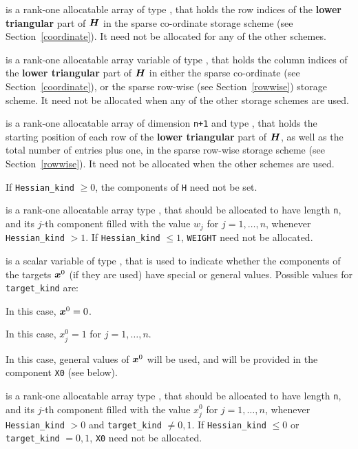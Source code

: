 \documentclass{galahad}
\begin{document}
\begin{description}
\begin{description}
 is a rank-one allocatable array of type \integer,
that holds the row indices of the {\bf lower triangular} part of ${\bm{H}}$
in the sparse co-ordinate storage scheme (see Section~\ref{coordinate}).
It need not be allocated for any of the other schemes.

 is a rank-one allocatable array variable of type \integer,
that holds the column indices of the {\bf lower triangular} part of
${\bm{H}}$ in either the sparse co-ordinate
(see Section~\ref{coordinate}), or the sparse row-wise
(see Section~\ref{rowwise}) storage scheme.
It need not be allocated when any of the other storage schemes are used.

 is a rank-one allocatable array of dimension {\tt n+1} and type
\integer, that holds the starting position of
each row of the {\bf lower triangular} part of ${\bm{H}}$, as well
as the total number of entries plus one, in the sparse row-wise storage
scheme (see Section~\ref{rowwise}). It need not be allocated when the
other schemes are used.
\end{description}
If {\tt Hessian\_kind} $\geq 0$, the components of {\tt H} need not be set.

 is a rank-one allocatable array type \realdp, that
should be allocated to have length {\tt n}, and its $j$-th component
filled with the value $w_{j}$ for $j = 1, \ldots , n$,
whenever {\tt Hessian\_kind} $>1$.
If {\tt Hessian\_kind} $\leq 1$, {\tt WEIGHT} need not be allocated.

 is a scalar variable of type \integer,
that is used to indicate whether the components of the targets ${\bm{x}}^0$
(if they are used) have special or general values. Possible values for
{\tt target\_kind} are:
\begin{description}
  In this case, ${\bm{x}}^0 = 0$.

 In this case, $x^0_{j} = 1$ for $j = 1, \ldots , n$.

 In this case, general values of ${\bm{x}}^0$ will be used,
     and will be provided in the component {\tt X0} (see below).
\end{description}

 is a rank-one allocatable array type \realdp, that
should be allocated to have length {\tt n}, and its $j$-th component
filled with the value $x_{j}^0$ for $j = 1, \ldots , n$,
whenever {\tt Hessian\_kind} $>0$ and {\tt target\_kind} $\neq 0,1$.
If {\tt Hessian\_kind} $\leq 0$ or {\tt target\_kind} $= 0,1$,
{\tt X0} need not be allocated.


\end{description}
\end{document}
